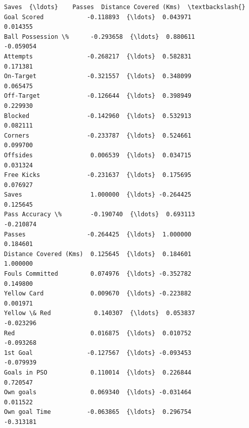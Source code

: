 \documentclass[11pt, a4paper]{report}
\begin{document}
\begin{tcolorbox}[breakable, size=fbox, boxrule=.5pt, pad at break*=1mm, opacityfill=0]
\begin{Verbatim}[commandchars=\\\{\}]
                           Saves  {\ldots}    Passes  Distance Covered (Kms)  \textbackslash{}
Goal Scored            -0.118893  {\ldots}  0.043971                0.014355
Ball Possession \%      -0.293658  {\ldots}  0.880611               -0.059054
Attempts               -0.268217  {\ldots}  0.582831                0.171381
On-Target              -0.321557  {\ldots}  0.348099                0.065475
Off-Target             -0.126644  {\ldots}  0.398949                0.229930
Blocked                -0.142960  {\ldots}  0.532913                0.082111
Corners                -0.233787  {\ldots}  0.524661                0.099700
Offsides                0.006539  {\ldots}  0.034715                0.031324
Free Kicks             -0.231637  {\ldots}  0.175695                0.076927
Saves                   1.000000  {\ldots} -0.264425                0.125645
Pass Accuracy \%        -0.190740  {\ldots}  0.693113               -0.210874
Passes                 -0.264425  {\ldots}  1.000000                0.184601
Distance Covered (Kms)  0.125645  {\ldots}  0.184601                1.000000
Fouls Committed         0.074976  {\ldots} -0.352782                0.149800
Yellow Card             0.009670  {\ldots} -0.223882                0.001971
Yellow \& Red            0.140307  {\ldots}  0.053837               -0.023296
Red                     0.016875  {\ldots}  0.010752               -0.093268
1st Goal               -0.127567  {\ldots} -0.093453               -0.079939
Goals in PSO            0.110014  {\ldots}  0.226844                0.720547
Own goals               0.069340  {\ldots} -0.031464                0.011522
Own goal Time          -0.063865  {\ldots}  0.296754               -0.313181


\end{Verbatim}
\end{tcolorbox}
\end{document}

